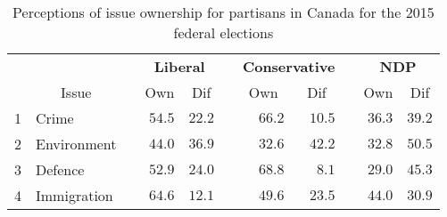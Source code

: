 \begin{table}[!ht]
\caption{Perceptions of issue ownership for partisans in Canada for the 2015 federal elections\label{partisanownership}} 
\begin{center}
\begin{tabular}{llcrrcrrcrr}
\toprule
\multicolumn{1}{l}{\bfseries }&\multicolumn{1}{c}{\bfseries }&\multicolumn{1}{c}{\bfseries }&\multicolumn{2}{c}{\bfseries Liberal}&\multicolumn{1}{c}{\bfseries }&\multicolumn{2}{c}{\bfseries Conservative}&\multicolumn{1}{c}{\bfseries }&\multicolumn{2}{c}{\bfseries NDP}\tabularnewline
\cline{4-5} \cline{7-8} \cline{10-11}
\multicolumn{1}{l}{}&\multicolumn{1}{c}{Issue}&\multicolumn{1}{c}{}&\multicolumn{1}{c}{Own}&\multicolumn{1}{c}{Dif}&\multicolumn{1}{c}{}&\multicolumn{1}{c}{Own}&\multicolumn{1}{c}{Dif}&\multicolumn{1}{c}{}&\multicolumn{1}{c}{Own}&\multicolumn{1}{c}{Dif}\tabularnewline
\midrule
1&Crime&&$54.5$&$22.2$&&$66.2$&$10.5$&&$36.3$&$39.2$\tabularnewline
2&Environment&&$44.0$&$36.9$&&$32.6$&$42.2$&&$32.8$&$50.5$\tabularnewline
3&Defence&&$52.9$&$24.0$&&$68.8$&$ 8.1$&&$29.0$&$45.3$\tabularnewline
4&Immigration&&$64.6$&$12.1$&&$49.6$&$23.5$&&$44.0$&$30.9$\tabularnewline
\bottomrule
\end{tabular}\end{center}
\end{table}

